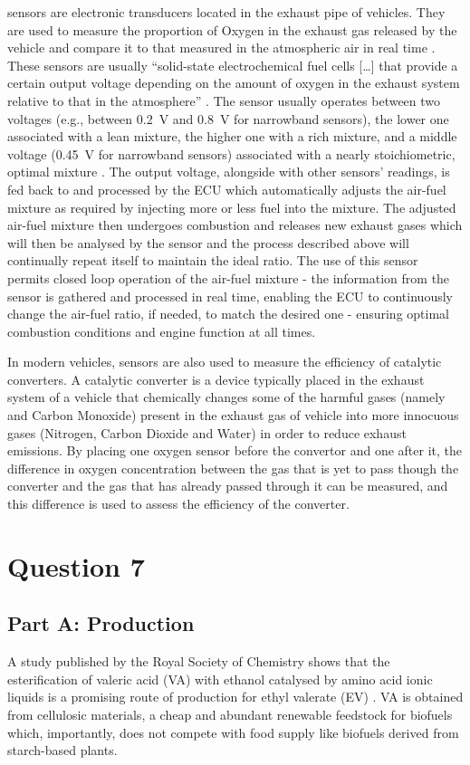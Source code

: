  sensors are electronic transducers located in the exhaust pipe of vehicles. They are used to measure the proportion of Oxygen in the exhaust gas released by the vehicle and compare it to that measured in the atmospheric air in real time \cite{q6-r4}. These sensors are usually “solid-state electrochemical fuel cells […] that provide a certain output voltage depending on the amount of oxygen in the exhaust system relative to that in the atmosphere” \cite{q6-r4}. The sensor usually operates between two voltages (e.g., between \SI{0.2}{\volt} and \SI{0.8}{\volt} for narrowband sensors), the lower one associated with a lean mixture, the higher one with a rich mixture, and a middle voltage (\SI{0.45}{\volt} for narrowband sensors) associated with a nearly stoichiometric, optimal mixture \cite{q6-r4}. The output voltage, alongside with other sensors’ readings, is fed back to and processed by the ECU which automatically adjusts the air-fuel mixture as required by injecting more or less fuel into the mixture. The adjusted air-fuel mixture then undergoes combustion and releases new exhaust gases which will then be analysed by the  sensor and the process described above will continually repeat itself to maintain the ideal ratio. The use of this sensor permits closed loop operation of the air-fuel mixture - the information from the sensor is gathered and processed in real time, enabling the ECU to continuously change the air-fuel ratio, if needed, to match the desired one - ensuring optimal combustion conditions and engine function at all times.

In modern vehicles,  sensors are also used to measure the efficiency of catalytic converters. A catalytic converter is a device typically placed in the exhaust system of a vehicle that chemically changes some of the harmful gases (namely  and Carbon Monoxide) present in the exhaust gas of vehicle into more innocuous gases (Nitrogen, Carbon Dioxide and Water) in order to reduce exhaust emissions. By placing one oxygen sensor before the convertor and one after it, the difference in oxygen concentration between the gas that is yet to pass though the converter and the gas that has already passed through it can be measured, and this difference is used to assess the efficiency of the converter.
\section{Question 7}
\subsection*{Part A: Production}
A study published by the Royal Society of Chemistry shows that the esterification of valeric acid (VA) with ethanol catalysed by amino acid ionic liquids is a promising route of production for ethyl valerate (EV) \cite{q7-r1}. VA is obtained from cellulosic materials, a cheap and abundant renewable feedstock for biofuels which, importantly, does not compete with food supply like biofuels derived from starch-based plants.

